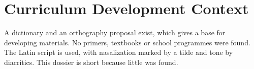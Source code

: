 \documentclass[12pt]{article}
\begin{document}
\section{Curriculum Development Context}
A dictionary and an orthography proposal exist, which gives a base for developing materials. No primers, textbooks or school programmes were found. The Latin script is used, with nasalization marked by a tilde and tone by diacritics. This dossier is short because little was found.
\end{document}

